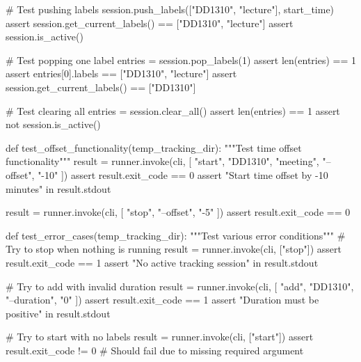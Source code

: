     # Test pushing labels
    session.push_labels(["DD1310", "lecture"], start_time)
    assert session.get_current_labels() == ["DD1310", "lecture"]
    assert session.is_active()
    
    # Test popping one label
    entries = session.pop_labels(1)
    assert len(entries) == 1
    assert entries[0].labels == ["DD1310", "lecture"]
    assert session.get_current_labels() == ["DD1310"]
    
    # Test clearing all
    entries = session.clear_all()
    assert len(entries) == 1
    assert not session.is_active()

def test_offset_functionality(temp_tracking_dir):
    """Test time offset functionality"""
    result = runner.invoke(cli, [
        "start", "DD1310", "meeting", "--offset", "-10"
    ])
    assert result.exit_code == 0
    assert "Start time offset by -10 minutes" in result.stdout
    
    result = runner.invoke(cli, [
        "stop", "--offset", "-5"
    ])
    assert result.exit_code == 0

def test_error_cases(temp_tracking_dir):
    """Test various error conditions"""
    # Try to stop when nothing is running
    result = runner.invoke(cli, ["stop"])
    assert result.exit_code == 1
    assert "No active tracking session" in result.stdout
    
    # Try to add with invalid duration
    result = runner.invoke(cli, [
        "add", "DD1310", "--duration", "0"
    ])
    assert result.exit_code == 1
    assert "Duration must be positive" in result.stdout
    
    # Try to start with no labels
    result = runner.invoke(cli, ["start"])
    assert result.exit_code != 0  # Should fail due to missing required argument
\nwendcode{}

%
%
%
%
%
%
%
%
%
%
%
%
%
%
\nwdocspar
\nwenddocs{}
